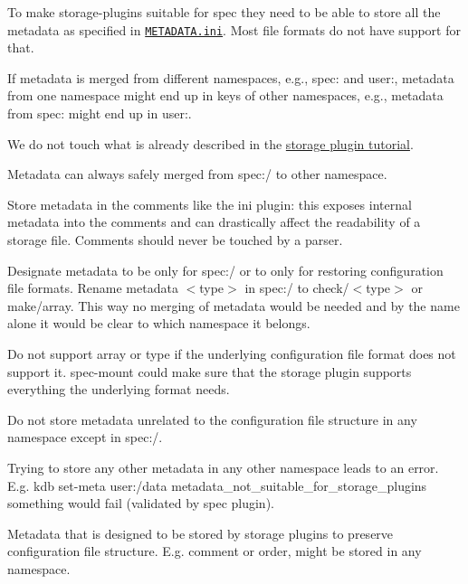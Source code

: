 To make storage-\/plugins suitable for {\ttfamily spec} they need to be able to store all the metadata as specified in \href{/home/jenkins/workspace/libelektra-release/doc/METADATA.ini}{\tt M\+E\+T\+A\+D\+A\+T\+A.\+ini}. Most file formats do not have support for that.

If metadata is merged from different namespaces, e.\+g., {\ttfamily spec\+:} and {\ttfamily user\+:}, metadata from one namespace might end up in keys of other namespaces, e.\+g., metadata from {\ttfamily spec\+:} might end up in {\ttfamily user\+:}.


\begin{DoxyItemize}
\item We do not touch what is already described in the \hyperlink{doc_tutorials_storage-plugins_md}{storage plugin tutorial}.
\end{DoxyItemize}


\begin{DoxyItemize}
\item Metadata can always safely merged from {\ttfamily spec\+:/} to other namespace.
\end{DoxyItemize}


\begin{DoxyItemize}
\item Store metadata in the comments like the {\ttfamily ini} plugin\+: this exposes internal metadata into the comments and can drastically affect the readability of a storage file. Comments should never be touched by a parser.
\item Designate metadata to be only for {\ttfamily spec\+:/} or to only for restoring configuration file formats. Rename metadata {\ttfamily $<$type$>$} in {\ttfamily spec\+:/} to {\ttfamily check/$<$type$>$} or {\ttfamily make/array}. This way no merging of metadata would be needed and by the name alone it would be clear to which namespace it belongs.
\item Do not support {\ttfamily array} or {\ttfamily type} if the underlying configuration file format does not support it. {\ttfamily spec-\/mount} could make sure that the storage plugin supports everything the underlying format needs.
\end{DoxyItemize}

Do not store metadata unrelated to the configuration file structure in any namespace except in {\ttfamily spec\+:/}.


\begin{DoxyItemize}
\item Trying to store any other metadata in any other namespace leads to an error. E.\+g. {\ttfamily kdb set-\/meta user\+:/data metadata\+\_\+not\+\_\+suitable\+\_\+for\+\_\+storage\+\_\+plugins something} would fail (validated by {\ttfamily spec} plugin).
\item Metadata that is designed to be stored by storage plugins to preserve configuration file structure. E.\+g. {\ttfamily comment} or {\ttfamily order}, might be stored in any namespace.
\end{DoxyItemize}

